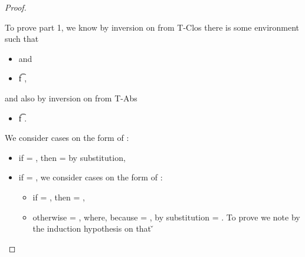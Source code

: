 \begin{lemma}
\begin{proof}
\begin{case}[T-App]
\begin{itemize}
\begin{subcase}[B-BetaClosure]
         To prove part 1, we know by inversion on  from T-Clos
         there is some environment {\propenvc{}} such that
         \begin{itemize}
           \item
               and
            \item
  \judgement {\propenvc{}} { {\ArrowOne {\x{}} {\s{}}
                                                       {\t{f}}
                                                       {
                                                                   {}}
                                                       {}}}
                {
                            {}}
                {},
         \end{itemize}
         and also by inversion on  from T-Abs
         \begin{itemize}
           \item
  { \judgement {\propenvc{}, {\isprop {\s{}} {\x{}}}}
              { {\t{f}}}
               {
                           {}}
               {}}.
         \end{itemize}

         We consider cases on the form of :

         \begin{itemize}
           \item if  = \emptyobject{}, then \object{} = \emptyobject{} by substitution,
           \item if  = { {\x{}}}, 
             we consider cases on the form of :
             \begin{itemize}
               \item if  = \emptyobject{}, then \object{} = \emptyobject{},
               \item otherwise  = { {\y{}}}, where,
                 because
                \object{} = {
                                         { {\y{}}}
                                         {\x{}}},
                                         by substitution
                                         \object{} = { { {\y{}}}}.
                                         To prove 
                                         we note by the induction hypothesis on {} that 
         {}
         {\v{}}


\end{itemize}
\end{itemize}
\end{subcase}
\end{itemize}
\end{case}
\end{proof}
\end{lemma}

